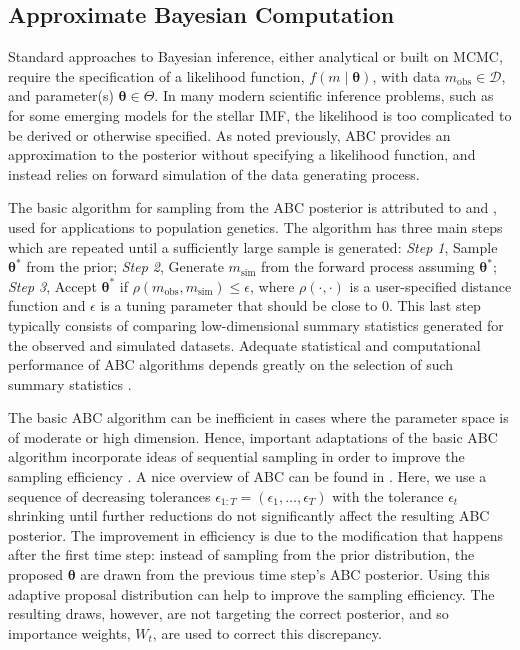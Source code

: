 \documentclass[ejs]{imsart}
\numberwithin{equation}{section}
\theoremstyle{plain}
\newcommand{\btheta}{\boldsymbol{\theta}}
\newcommand{\msim}{m_{\text{sim}}}
\newcommand{\mobs}{m_{\text{obs}}}
\begin{document}
\subsection{Approximate Bayesian Computation}

Standard approaches to Bayesian inference, either analytical or built on
MCMC, require the specification of a
likelihood function, $f(m \mid \btheta)$, with data $\mobs \in \mathcal D$, 
and parameter(s) $\btheta \in \Theta$. In many modern scientific inference 
problems, such as for some emerging models for the stellar IMF, the likelihood is too complicated to be derived or otherwise
specified. 
As noted previously, ABC provides an approximation to the posterior
without specifying a likelihood function, and instead relies on forward simulation of the data generating
process.

The basic algorithm for sampling from the ABC posterior is attributed to 
\cite{TavareEtAl1997} and \cite{PitchardEtAl1999}, used for applications to population 
genetics. The algorithm has three main steps which are repeated until a sufficiently
large sample is generated:
\emph{Step 1}, Sample $\btheta^*$ from the prior; \emph{Step 2}, 
Generate $\msim$ from the forward process assuming $\btheta^*$; 
 \emph{Step 3},  
Accept $\btheta^*$ if $\rho(\mobs, \msim) \leq \epsilon$, where $\rho(\cdot, \cdot)$ is a user-specified distance function and $\epsilon$ is a tuning parameter that should be close to 0.
This last step typically consists of comparing low-dimensional summary statistics generated
for the observed and simulated datasets. 
Adequate statistical and computational performance of ABC algorithms depends greatly on the
selection of such summary statistics
\citep{JoyceMarjoram2008,BlumFrancois2010, Blum2010, FearnheadPrangle2012, BlumEtAl2013}.

The basic ABC algorithm can be inefficient in cases where the parameter space is of moderate
or high dimension.
Hence, important adaptations of the basic ABC algorithm incorporate ideas of sequential sampling in 
order to improve the sampling efficiency \citep{MarjoramEtAl2003,SissonEtAl2007,beaumont2009, DelMoralEtAl2011}.  A nice overview of ABC can be found in \cite{MarinEtAl2012}.  
Here, we use a sequence of decreasing tolerances $\epsilon_{1:T} = (\epsilon_1, \ldots, \epsilon_T)$ 
with the tolerance $\epsilon_t$ shrinking until further reductions do not significantly affect the 
resulting ABC posterior.
The improvement in efficiency is due to the modification that happens after the first time step: 
instead of sampling from the prior distribution, the proposed $\btheta$ are drawn from the previous time step's ABC posterior.  Using this adaptive proposal distribution can help to improve the sampling efficiency.  The resulting draws, however, are not targeting the correct posterior, and so importance weights, $W_t$, are used to correct this discrepancy.
\end{document}
